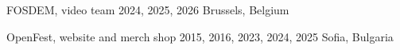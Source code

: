 

\begin{cvhonors}

  \cvhonor
    {FOSDEM, video team} %
    {2024, 2025, 2026} %
    {Brussels, Belgium} %

  \cvhonor
    {OpenFest, website and merch shop} %
    {2015, 2016, 2023, 2024, 2025} %
    {Sofia, Bulgaria} %

\end{cvhonors}
